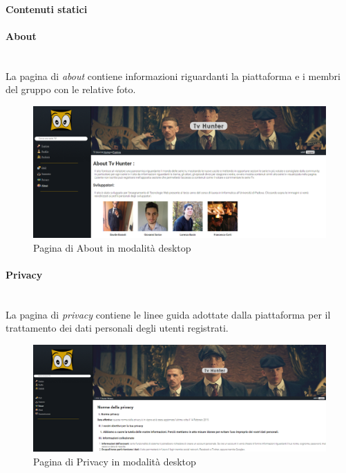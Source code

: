 \paragraph{Contenuti statici}

\paragraph{About} 
~\\	
La pagina di \textit{about} contiene informazioni riguardanti la piattaforma e i membri del gruppo con le relative foto. 
\begin{figure}[H]
	\centerline{\includegraphics[scale=0.33]{img/about.png}}
	\caption{Pagina di About in modalità desktop}
	\label{fig:addForm} 
\end{figure}	

\paragraph{Privacy} 
~\\	
La pagina di \textit{privacy} contiene le linee guida adottate dalla piattaforma per il trattamento dei dati personali degli utenti registrati.
\begin{figure}[h!]
	\centerline{\includegraphics[scale=0.25]{img/privacy.png}}
	\caption{Pagina di Privacy in modalità desktop}
	\label{fig:addForm} 
\end{figure}	

